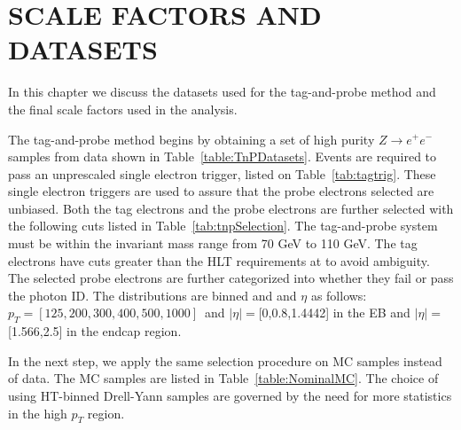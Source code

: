\chapter{SCALE FACTORS AND DATASETS}
\RaggedRight \parindent=25pt
\label{ch:appendix_scaleFactors}
In this chapter we discuss the datasets used for the tag-and-probe method and the final scale factors used in the analysis.

The tag-and-probe method begins by obtaining a set of high purity $Z \to e^{+}e^{-}$ samples from data shown in Table~\ref{table:TnPDatasets}. Events are required to pass an unprescaled single electron trigger, listed on Table~\ref{tab:tagtrig}. These single electron triggers are used to assure that the probe electrons selected are unbiased. Both the tag electrons and the probe electrons are further selected with the following cuts listed in Table~\ref{tab:tnpSelection}. The tag-and-probe system must be within the invariant mass range from 70 GeV to 110 GeV. The tag electrons have \pt cuts greater than the HLT requirements at to avoid ambiguity. The selected probe electrons are further categorized into whether they fail or pass the photon ID. The distributions are binned and \pt and $\eta$ as follows: $p_{T}=[125,200,300,400,500,1000]$~\GeV and $|\eta|=$[0,0.8,1.4442] in the EB and $|\eta|=$[1.566,2.5] in the endcap region. 

In the next step, we apply the same selection procedure on MC samples instead of data. The MC samples are listed in Table~\ref{table:NominalMC}. The choice of using HT-binned Drell-Yann samples are governed by the need for more statistics in the high $p_{T}$ region.

\begin{table}[!htbp]
  \centering
  \caption{Nominal MC samples used for TnP}
\end{table}~\label{table:NominalMC}

